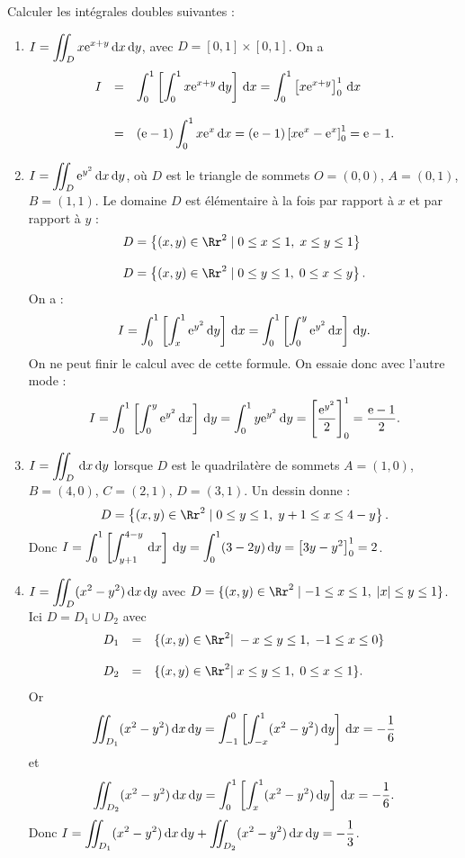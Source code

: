 \documentclass[class=report,crop=false]{standalone}
\begin{document}
\vskip6mm

Calculer les intégrales doubles suivantes :
\begin{enumerate}
\item $\displaystyle I=\int \!\!\!\!\int _Dx{\rm e} ^{x+y}\,\mathrm{d} x\,\mathrm{d} y$, avec $D=[0,1]\times [0,1]$.
On a 
$$\begin{array}{ccl}I&=&\displaystyle \int_0^1\left[\int _{0}^{1}x{\rm e} ^{x+y}\,\mathrm{d} y\right]\,\mathrm{d} x=\int_0^1\left[x{\rm e} ^{x+y}\right]_0^1\,\mathrm{d} x \\ \\ &=&\displaystyle ({\rm e} -1)\int_0^1x{\rm e} ^{x}\,\mathrm{d} x=({\rm e} -1)\left[x{\rm e} ^x-{\rm e} ^x\right]_0^1={\rm e} -1.\end{array}$$
\item $\displaystyle I=\int \!\!\!\!\int _D{\rm e}^{y^2}\,\mathrm{d} x\,\mathrm{d} y$, o\`u $D$ est le triangle de sommets $O=(0,0)$, $A=(0,1)$, $B=(1,1)$. Le domaine $D$ est élémentaire à la fois par rapport à $x$ et par rapport à $y$ :
$$\begin{array}{l}\displaystyle D=\left\{(x,y)\in \Rr^2\mid 0\leq x\leq 1,\; x\leq y\leq 1\right\}\\ \\ \displaystyle D=\left\{(x,y)\in \Rr^2\mid 0\leq y\leq 1,\; 0\leq x\leq y\right\}.\end{array}$$
On a :
$$\displaystyle I=\int _0^1\left[\int _x^1{\rm e} ^{y^2}\,\mathrm{d} y\right]\,\mathrm{d} x =\int _0^1\left[\int _0^y{\rm e} ^{y^2}\,\mathrm{d} x\right]\,\mathrm{d} y.$$
On ne peut finir le calcul avec de cette formule. On essaie donc avec l'autre mode :
$$\displaystyle I=\int _0^1\left[\int _0^y{\rm e} ^{y^2}\,\mathrm{d} x\right]\,\mathrm{d} y=\int _0^1y{\rm e} ^{y^2}\,\mathrm{d} y=\left[\frac{{\rm e} ^{y^2}}{2}\right]_0^1=\frac{{\rm e} -1}{2}.$$
\item $\displaystyle I=\int \!\!\!\!\int _D\,\mathrm{d} x\,\mathrm{d} y$ lorsque $D$ est le quadrilatère de sommets $A=(1,0)$, $B=(4,0)$, $C=(2,1)$, $D=(3,1)$. Un dessin donne :
$$D=\left\{(x,y)\in \Rr^2\mid 0\leq y\leq 1,\;y+1\leq x\leq 4-y\right\}.$$
Donc $\displaystyle I=\int_0^1\left[\int _{y+1}^{4-y}\,\mathrm{d} x\right]\,\mathrm{d} y=\int_0^1(3-2y)\,\mathrm{d} y=\left[3y-y^2\right]_0^1=2$.
\item $\displaystyle I=\int \!\!\!\!\int _D(x^2-y^2)\,\mathrm{d} x\,\mathrm{d} y$ avec $D=\{(x,y)\in \Rr^2\mid -1\leq x\leq 1,\;|x|\leq y\leq 1\}$. Ici $D=D_1\cup D_2$ avec 
$$\begin{array}{ccl}\displaystyle D_1&=&\{(x,y)\in \Rr^2|\; -x\leq y\leq 1,\; -1\leq x\leq 0\}\\ \\ \displaystyle D_2&=&\{(x,y)\in \Rr^2|\; x\leq y\leq 1,\; 0\leq x\leq 1\}.\end{array}$$
Or
$$\int \!\!\!\!\int _{D_1}(x^2-y^2)\,\mathrm{d} x\,\mathrm{d} y=\int_{-1}^0\left[\int _{-x}^{1}(x^2-y^2)\,\mathrm{d} y\right]\,\mathrm{d} x=-\frac{1}{6}$$
et 
$$\int \!\!\!\!\int _{D_2}(x^2-y^2)\,\mathrm{d} x\,\mathrm{d} y=\int_{0}^1\left[\int _{x}^{1}(x^2-y^2)\,\mathrm{d} y\right]\,\mathrm{d} x=-\frac{1}{6}.$$
Donc $\displaystyle I=\int \!\!\!\!\int _{D_1}(x^2-y^2)\d x\d y+\int \!\!\!\!\int _{D_2}(x^2-y^2)\d x\d y=-\frac{1}{3}$.
\end{enumerate}
\end{document}
